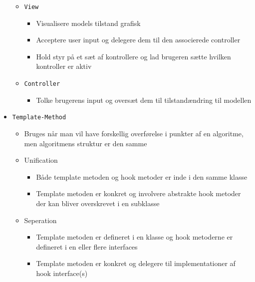 \documentclass[a4, english]{article}
\begin{document}
\begin{itemize}
\begin{itemize}
\begin{itemize}
    \end{itemize}
    \item \texttt{View}
    \begin{itemize}
    	\item Visualisere models tilstand grafisk
      \item Acceptere user input og delegere dem til den associerede controller
      \item Hold styr på et sæt af kontrollere og lad brugeren sætte hvilken kontroller er aktiv
    \end{itemize}
    \item \texttt{Controller}
    \begin{itemize}
    	\item Tolke brugerens input og oversæt dem til tilstandændring til modellen 
    \end{itemize}
  \end{itemize}
  \item \texttt{Template-Method}
  \begin{itemize}
  	\item Bruges når man vil have forskellig overførelse i punkter af en algoritme, men algoritmens struktur er den samme
    \item Unification 
    \begin{itemize}
    	\item Både template metoden og hook metoder er inde i den samme klasse
      \item Template metoden er konkret og involvere abstrakte hook metoder der kan bliver overskrevet i en subklasse 
    \end{itemize}
	  \item Seperation
    \begin{itemize}
    	\item Template metoden er defineret i en klasse og hook metoderne er defineret i en eller flere interfaces 
      \item Template metoden er konkret og delegere til implementationer af hook interface(s) 
    \end{itemize}  
  \end{itemize}
\end{itemize}
\newpage

  
\end{document}
